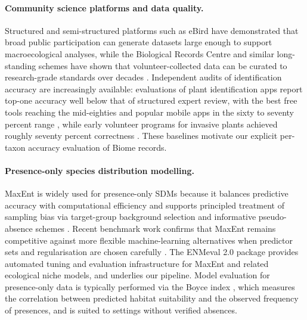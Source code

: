 \paragraph{Community science platforms and data quality.}
Structured and semi-structured platforms such as eBird \citep{sullivan2009ebird} have demonstrated that broad public participation can generate datasets large enough to support macroecological analyses, while the Biological Records Centre and similar long-standing schemes have shown that volunteer-collected data can be curated to research-grade standards over decades \citep{pocock2015brc,bonney2009citizen,chandler2017contribution}. Independent audits of identification accuracy are increasingly available: evaluations of plant identification apps report top-one accuracy well below that of structured expert review, with the best free tools reaching the mid-eighties and popular mobile apps in the sixty to seventy percent range \citep{hart2023plantapps}, while early volunteer programs for invasive plants achieved roughly seventy percent correctness \citep{crall2011assessing}. These baselines motivate our explicit per-taxon accuracy evaluation of Biome records.

\paragraph{Presence-only species distribution modelling.}
MaxEnt is widely used for presence-only SDMs because it balances predictive accuracy with computational efficiency and supports principled treatment of sampling bias via target-group background selection and informative pseudo-absence schemes \citep{phillips2006maxent,phillips2008maxentextensions,phillips2009samplebias,elith2011statistical}. Recent benchmark work confirms that MaxEnt remains competitive against more flexible machine-learning alternatives when predictor sets and regularisation are chosen carefully \citep{valavi2022predictive}. The ENMeval 2.0 package \citep{kass2021enmeval} provides automated tuning and evaluation infrastructure for MaxEnt and related ecological niche models, and underlies our pipeline. Model evaluation for presence-only data is typically performed via the Boyce index \citep{hirzel2006boyce}, which measures the correlation between predicted habitat suitability and the observed frequency of presences, and is suited to settings without verified absences.

